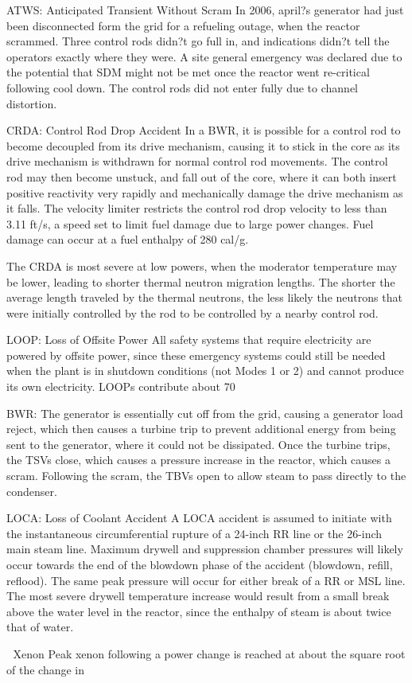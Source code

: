 \documentclass[10pt]{article}
\begin{document}
ATWS: Anticipated Transient Without Scram
In 2006, april?s generator had just been disconnected form the grid for a refueling outage, when the reactor scrammed. Three control rods didn?t go full in, and indications didn?t tell the operators exactly where they were. A site general emergency was declared due to the potential that SDM might not be met once the reactor went re-critical following cool down. The control rods did not enter fully due to channel distortion. 

CRDA: Control Rod Drop Accident
In a BWR, it is possible for a control rod to become decoupled from its drive mechanism, causing it to stick in the core as its drive mechanism is withdrawn for normal control rod movements. The control rod may then become unstuck, and fall out of the core, where it can both insert positive reactivity very rapidly and mechanically damage the drive mechanism as it falls. The velocity limiter restricts the control rod drop velocity to less than 3.11 ft/s, a speed set to limit fuel damage due to large power changes. Fuel damage can occur at a fuel enthalpy of 280 cal/g. 

The CRDA is most severe at low powers, when the moderator temperature may be lower, leading to shorter thermal neutron migration lengths. The shorter the average length traveled by the thermal neutrons, the less likely the neutrons that were initially controlled by the rod to be controlled by a nearby control rod. 

LOOP: Loss of Offsite Power
All safety systems that require electricity are powered by offsite power, since these emergency systems could still be needed when the plant is in shutdown conditions (not Modes 1 or 2) and cannot produce its own electricity. LOOPs contribute about 70%

BWR: The generator is essentially cut off from the grid, causing a generator load reject, which then causes a turbine trip to prevent additional energy from being sent to the generator, where it could not be dissipated. Once the turbine trips, the TSVs close, which causes a pressure increase in the reactor, which causes a scram. Following the scram, the TBVs open to allow steam to pass directly to the condenser. 

LOCA: Loss of Coolant Accident
A LOCA accident is assumed to initiate with the instantaneous circumferential rupture of a 24-inch RR line or the 26-inch main steam line. Maximum drywell and suppression chamber pressures will likely occur towards the end of the blowdown phase of the accident (blowdown, refill, reflood). The same peak pressure will occur for either break of a RR or MSL line. The most severe drywell temperature increase would result from a small break above the water level in the reactor, since the enthalpy of steam is about twice that of water. 




Xenon
Peak xenon following a power change is reached at about the square root of the change in %
\end{document}
